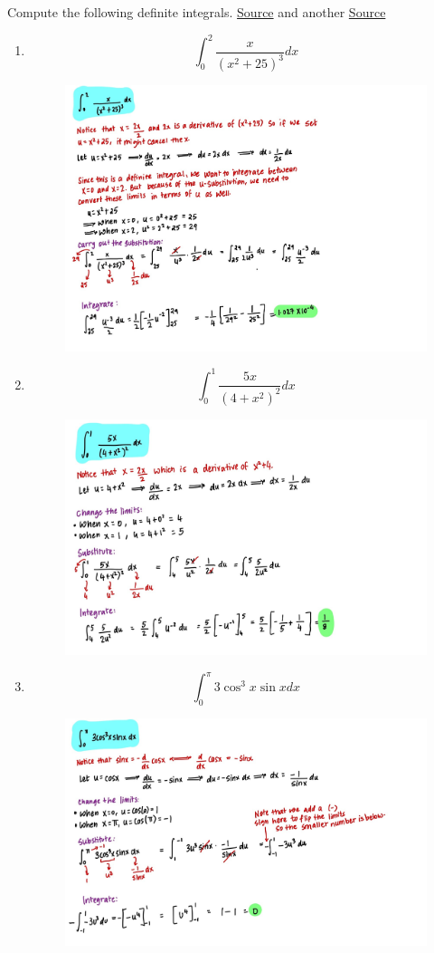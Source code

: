 \documentclass{article}
\begin{document}
\noindent Compute the following definite integrals.
\newline \noindent \href{https://www.math.purdue.edu/~dstratma/2015.Spring.Worksheets/2015.Spring.Lecture2.Worksheet.pdf}{Source} and another \href{https://people.math.sc.edu/josephcf/Teaching/122/Files/Handouts%20and%20Worksheets/Substitution%20+%20Definite%20Integrals.pdf}{Source}

\begin{enumerate}
    \item $$\int_0^2{\frac{x}{(x^2+25)^3}}dx$$
    \begin{figure}[H]
        \centering
        \includegraphics[width=0.7\linewidth]{Q1.1.jpg}
        \label{fig:Q1.1}
    \end{figure}
    \item $$\int_0^1{\frac{5x}{(4+x^2)^2}}dx$$
    \begin{figure}[H]
        \centering
        \includegraphics[width=0.7\linewidth]{Q1.2.jpg}
        \label{fig:Q1.2}
    \end{figure}
    \item $$\int_0^\pi{3\cos^3x\sin x}dx$$
    \begin{figure}[H]
        \centering
        \includegraphics[width=0.7\linewidth]{Q1.3.jpg}

\end{figure}
\end{enumerate}
\end{document}
